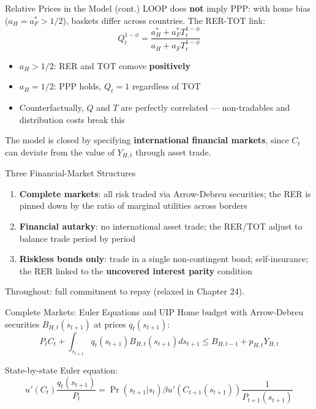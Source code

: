 \documentclass[blue]{beamer}
\begin{document}
\begin{frame}{Relative Prices in the Model (cont.)}
\bigskip
LOOP does \textbf{not} imply PPP: with home bias ($a_H = a_F^* > 1/2$), baskets differ across countries. The RER-TOT link:
\[
Q_t^{1-\phi} = \frac{a_H^* + a_F^* T_t^{1-\phi}}{a_H + a_F T_t^{1-\phi}}
\]

\begin{itemize}
    \item $a_H > 1/2$: RER and TOT comove \textbf{positively}
    \item $a_H = 1/2$: PPP holds, $Q_t = 1$ regardless of TOT
    \item Counterfactually, $Q$ and $T$ are perfectly correlated --- non-tradables and distribution costs break this
\end{itemize}

\bigskip
The model is closed by specifying \textbf{international financial markets}, since $C_t$ can deviate from the value of $Y_{H,t}$ through asset trade.
\end{frame}

\begin{frame}{Three Financial-Market Structures}
\begin{enumerate}
    \item \textbf{Complete markets}: all risk traded via Arrow-Debreu securities; the RER is pinned down by the ratio of marginal utilities across borders

    \item \textbf{Financial autarky}: no international asset trade; the RER/TOT adjust to balance trade period by period

    \item \textbf{Riskless bonds only}: trade in a single non-contingent bond; self-insurance; the RER linked to the \textbf{uncovered interest parity} condition
\end{enumerate}

\bigskip
Throughout: full commitment to repay (relaxed in Chapter 24).
\end{frame}

\begin{frame}{Complete Markets: Euler Equations and UIP}
Home budget with Arrow-Debreu securities $B_{H,t}(s_{t+1})$ at prices $q_t(s_{t+1})$:
\[
P_tC_t + \int_{s_{t+1}} q_t(s_{t+1})B_{H,t}(s_{t+1}) ds_{t+1} \leq B_{H,t-1} + p_{H,t}Y_{H,t}
\]

State-by-state Euler equation:
\[
u'(C_t)\frac{q_t(s_{t+1})}{P_t} = \Pr(s_{t+1}|s_t)\beta u'(C_{t+1}(s_{t+1}))\frac{1}{P_{t+1}(s_{t+1})}
\]

\end{frame}
\end{document}

